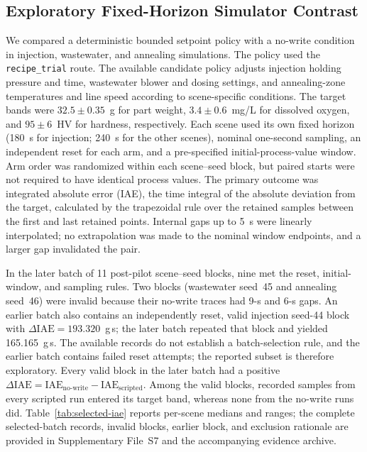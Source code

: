 \documentclass[journal]{IEEEtran}
\begin{document}
\subsection{Exploratory Fixed-Horizon Simulator Contrast}
\label{sec:eval-optimization}
We compared a deterministic bounded setpoint policy with a no-write condition in injection, wastewater, and annealing simulations. The policy used the \texttt{recipe\_trial} route. The available candidate policy adjusts injection holding pressure and time, wastewater blower and dosing settings, and annealing-zone temperatures and line speed according to scene-specific conditions. The target bands were $32.5\pm0.35$~g for part weight, $3.4\pm0.6$~mg/L for dissolved oxygen, and $95\pm6$~HV for hardness, respectively. Each scene used its own fixed horizon (180~s for injection; 240~s for the other scenes), nominal one-second sampling, an independent reset for each arm, and a pre-specified initial-process-value window. Arm order was randomized within each scene--seed block, but paired starts were not required to have identical process values. The primary outcome was integrated absolute error (IAE), the time integral of the absolute deviation from the target, calculated by the trapezoidal rule over the retained samples between the first and last retained points. Internal gaps up to 5~s were linearly interpolated; no extrapolation was made to the nominal window endpoints, and a larger gap invalidated the pair.

In the later batch of 11 post-pilot scene--seed blocks, nine met the reset, initial-window, and sampling rules. Two blocks (wastewater seed~45 and annealing seed~46) were invalid because their no-write traces had 9-s and 6-s gaps. An earlier batch also contains an independently reset, valid injection seed-44 block with $\Delta\mathrm{IAE}=193.320$~g\,s; the later batch repeated that block and yielded 165.165~g\,s. The available records do not establish a batch-selection rule, and the earlier batch contains failed reset attempts; the reported subset is therefore exploratory. Every valid block in the later batch had a positive $\Delta\mathrm{IAE}=\mathrm{IAE}_{\mathrm{no\text{-}write}}-\mathrm{IAE}_{\mathrm{scripted}}$. Among the valid blocks, recorded samples from every scripted run entered its target band, whereas none from the no-write runs did. Table~\ref{tab:selected-iae} reports per-scene medians and ranges; the complete selected-batch records, invalid blocks, earlier block, and exclusion rationale are provided in Supplementary File~S7 and the accompanying evidence archive.
\end{document}
